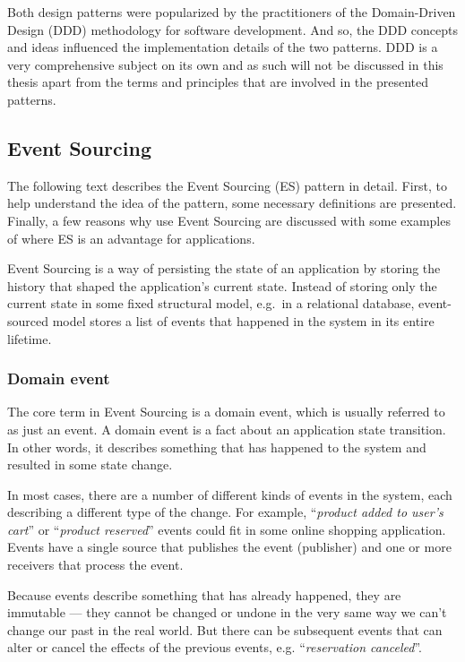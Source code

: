 \documentclass{book}
\begin{document}
Both design patterns were popularized by the practitioners of the
Domain-Driven Design (DDD) \cite{ddd} methodology for software
development. And so, the DDD concepts and ideas influenced the
implementation details of the two patterns. DDD is a very comprehensive
subject on its own and as such will not be discussed in this thesis
apart from the terms and principles that are involved in the presented
patterns.


\subsection{Event Sourcing}\label{event-sourcing}

The following text describes the Event Sourcing (ES) pattern in detail.
First, to help understand the idea of the pattern, some necessary
definitions are presented. Finally, a few reasons why use Event Sourcing
are discussed with some examples of where ES is an advantage for
applications.

Event Sourcing is a way of persisting the state of an application by
storing the history that shaped the application's current state. Instead
of storing only the current state in some fixed structural model,
e.g.~in a relational database, event-sourced model stores a list of
events that happened in the system in its entire lifetime.
\cite{journey} \cite{greg-youtube}

\subsubsection{Domain event}\label{domain-event}

The core term in Event Sourcing is a domain event, which is usually
referred to as just an event. A domain event is a fact about an
application state transition. In other words, it describes something
that has happened to the system and resulted in some state change.

In most cases, there are a number of different kinds of events in the
system, each describing a different type of the change. For example,
``\emph{product added to user's cart}'' or ``\emph{product reserved}''
events could fit in some online shopping application. Events have a
single source that publishes the event (publisher) and one or more
receivers that process the event.

Because events describe something that has already happened, they are
immutable --- they cannot be changed or undone in the very same way we
can't change our past in the real world. But there can be subsequent
events that can alter or cancel the effects of the previous events, e.g.
``\emph{reservation canceled}''.
\end{document}
